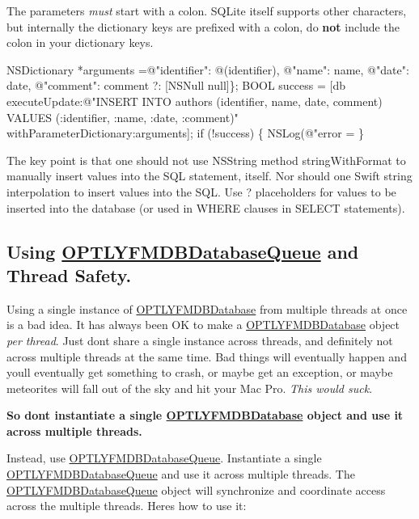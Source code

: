 The parameters {\itshape must} start with a colon. S\+Q\+Lite itself supports other characters, but internally the dictionary keys are prefixed with a colon, do {\bfseries not} include the colon in your dictionary keys.


\begin{DoxyCode}
NSDictionary *arguments =@"identifier": @(identifier), @"name": name, @"date": date, @"comment": comment ?:
       [NSNull null]\};
BOOL success = [db executeUpdate:@"INSERT INTO authors (identifier, name, date, comment) VALUES
       (:identifier, :name, :date, :comment)" withParameterDictionary:arguments];
if (!success) \{
    NSLog(@"error = %
\}
\end{DoxyCode}


The key point is that one should not use {\ttfamily N\+S\+String} method {\ttfamily string\+With\+Format} to manually insert values into the S\+QL statement, itself. Nor should one Swift string interpolation to insert values into the S\+QL. Use {\ttfamily ?} placeholders for values to be inserted into the database (or used in {\ttfamily W\+H\+E\+RE} clauses in {\ttfamily S\+E\+L\+E\+CT} statements).

\subsection*{Using \mbox{\hyperlink{interface_o_p_t_l_y_f_m_d_b_database_queue}{O\+P\+T\+L\+Y\+F\+M\+D\+B\+Database\+Queue}} and Thread Safety.}

Using a single instance of {\ttfamily \mbox{\hyperlink{interface_o_p_t_l_y_f_m_d_b_database}{O\+P\+T\+L\+Y\+F\+M\+D\+B\+Database}}} from multiple threads at once is a bad idea. It has always been OK to make a {\ttfamily \mbox{\hyperlink{interface_o_p_t_l_y_f_m_d_b_database}{O\+P\+T\+L\+Y\+F\+M\+D\+B\+Database}}} object {\itshape per thread}. Just don\textquotesingle{}t share a single instance across threads, and definitely not across multiple threads at the same time. Bad things will eventually happen and you\textquotesingle{}ll eventually get something to crash, or maybe get an exception, or maybe meteorites will fall out of the sky and hit your Mac Pro. {\itshape This would suck}.

{\bfseries So don\textquotesingle{}t instantiate a single {\ttfamily \mbox{\hyperlink{interface_o_p_t_l_y_f_m_d_b_database}{O\+P\+T\+L\+Y\+F\+M\+D\+B\+Database}}} object and use it across multiple threads.}

Instead, use {\ttfamily \mbox{\hyperlink{interface_o_p_t_l_y_f_m_d_b_database_queue}{O\+P\+T\+L\+Y\+F\+M\+D\+B\+Database\+Queue}}}. Instantiate a single {\ttfamily \mbox{\hyperlink{interface_o_p_t_l_y_f_m_d_b_database_queue}{O\+P\+T\+L\+Y\+F\+M\+D\+B\+Database\+Queue}}} and use it across multiple threads. The {\ttfamily \mbox{\hyperlink{interface_o_p_t_l_y_f_m_d_b_database_queue}{O\+P\+T\+L\+Y\+F\+M\+D\+B\+Database\+Queue}}} object will synchronize and coordinate access across the multiple threads. Here\textquotesingle{}s how to use it\+:

